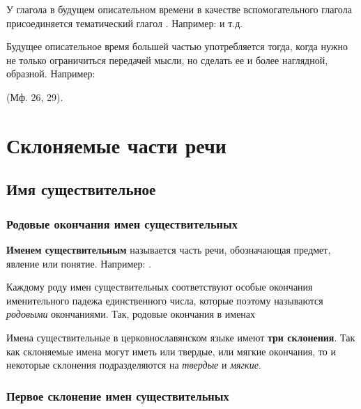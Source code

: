 \documentclass[11pt,a4paper,oneside]{memoir}
\begin{document}
    \bigskip{}

    У глагола {} в будущем описательном времени в качестве вспомогательного глагола присоединяется тематический глагол {}. Например: {} и т.д.
    
    Будущее описательное время большей частью употребляется тогда, когда нужно не только ограничиться передачей мысли, но сделать ее и более наглядной, образной. Например:
    
    {} (Мф. 26, 29).

        \section{Склоняемые части речи}
            \subsection{Имя существительное}
                \subsubsection{Родовые окончания имен существительных}

    \textbf{Именем существительным} называется часть речи, обозначающая предмет, явление или понятие. Например: {}.
    
    Каждому роду имен существительных соответствуют особые окончания именительного падежа единственного числа, которые поэтому называются \emph{родовыми} окончаниями. Так, родовые окончания в именах
    
    \bigskip{}

    Имена существительные в церковнославянском языке имеют \textbf{три склонения}. Так как склоняемые имена могут иметь или твердые, или мягкие окончания, то и некоторые склонения подразделяются на \emph{твердые} и \emph{мягкие}.

                \subsubsection{Первое склонение имен существительных}
\end{document}
